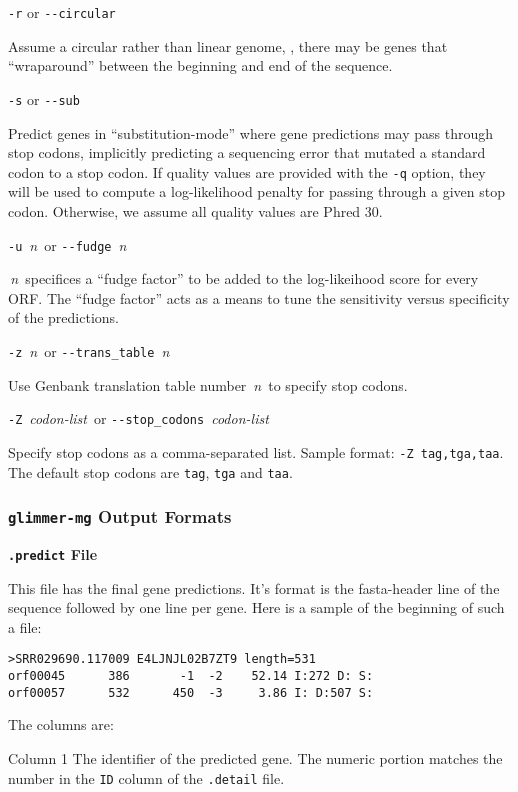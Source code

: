\documentclass[fleqn,titlepage,11pt]{article}
\def\Desc#1{\,\mbox{\emph{#1}}\,}
\def\Pg#1{\texttt{#1}}
\begin{document}
\exdent
  \verb`-r` \enskip or \enskip \verb`--circular`

  Assume a circular rather than linear genome, \ie, there may
  be genes that ``wraparound'' between the beginning and end
  of the sequence.

\exdent
  \verb`-s` \enskip or \enskip \verb`--sub`

  Predict genes in ``substitution-mode'' where gene predictions may
  pass through stop codons, implicitly predicting a sequencing error
  that mutated a standard codon to a stop codon. If quality values are
  provided with the \verb`-q` option, they will be used to compute a
  log-likelihood penalty for passing through a given stop
  codon. Otherwise, we assume all quality values are Phred 30.

\exdent
  \verb`-u` \Desc{n} \enskip or \enskip \verb`--fudge` \Desc{n}

  \Desc{n} specifices a ``fudge factor'' to be added to the
  log-likeihood score for every ORF. The ``fudge factor'' acts as a
  means to tune the sensitivity versus specificity of the predictions.
  
\exdent
  \verb`-z` \Desc{n} \enskip or \enskip \verb`--trans_table` \Desc{n}

  Use Genbank translation table number \Desc{n} to specify stop codons.

\exdent
  \verb`-Z` \Desc{codon-list} \enskip or \enskip \verb`--stop_codons` \Desc{codon-list}

  Specify stop codons as a comma-separated list.
  Sample format:  \verb`-Z tag,tga,taa`.
  The default stop codons are \Pg{tag}, \Pg{tga} and \Pg{taa}.
\el


\subsubsection{\Pg{glimmer-mg} Output Formats}

\smallskip
\noindent\textbf{\Pg{.predict} File}
\smallskip

This file has the final gene predictions.  It's format is the fasta-header
line of the sequence followed by one line per gene.  Here is a sample of the
beginning of such a file:
\BSV
\begin{verbatim}
>SRR029690.117009 E4LJNJL02B7ZT9 length=531
orf00045      386       -1  -2    52.14 I:272 D: S:
orf00057      532      450  -3     3.86 I: D:507 S:
\end{verbatim}
\ESV
The columns are:
\RaggedRight
\item[Column 1]
  The identifier of the predicted gene.  The numeric portion matches the
  number in the \Pg{ID} column of the \Pg{.detail} file.
\end{document}
